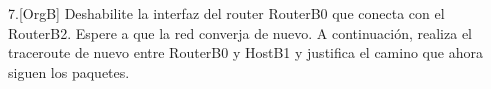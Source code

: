 \begin{ejer}
7.[OrgB]  Deshabilite la interfaz del router RouterB0 que conecta con el RouterB2. Espere a que la red converja de nuevo. A continuación, realiza el traceroute de nuevo entre RouterB0 y HostB1 y justifica el camino que ahora siguen los paquetes.
\end{ejer}